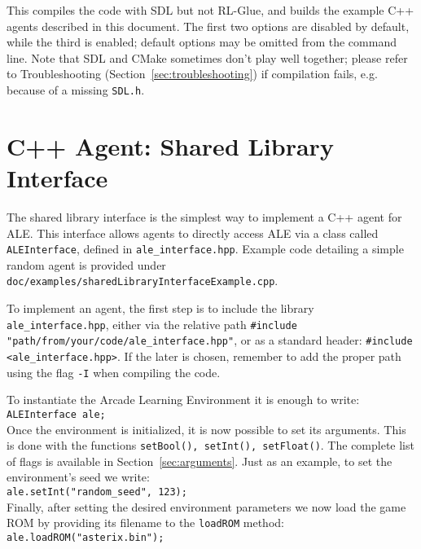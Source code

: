 \documentclass[12pt]{article}
\begin{document}
This compiles the code with SDL but not RL-Glue, and builds the example C++ agents described
in this document. The first two options are disabled by default, while the third is
enabled; default options may be omitted from the command line. Note that SDL and CMake sometimes 
don't play well together; please refer to Troubleshooting 
(Section~\ref{sec:troubleshooting}) if compilation fails, e.g. because of a missing \verb+SDL.h+.

\section{C++ Agent: Shared Library Interface} \label{sec:shared_library_interface}

The shared library interface is the simplest way to implement a C++ agent for ALE.
This interface allows agents to directly access ALE via a class called
\verb+ALEInterface+, defined in \verb+ale_interface.hpp+. Example code detailing a simple random agent is provided under \verb+doc/examples/sharedLibraryInterfaceExample.cpp+.

To implement an agent, the first step is to include the library \verb+ale_interface.hpp+, either via 
the relative path \verb+#include "path/from/your/code/ale_interface.hpp"+, or as a standard 
header: \verb+#include <ale_interface.hpp>+. If the later is chosen, remember to add the proper 
path using the flag \verb+-I+ when compiling the code.

To instantiate the Arcade Learning Environment it is enough to write:\\

\verb+ALEInterface ale;+\\

Once the environment is initialized, it is now possible to set its arguments. This is done with the 
functions \verb+setBool(), setInt(), setFloat()+. The complete list of flags is available in 
Section~\ref{sec:arguments}. Just as an example, to set the environment's seed we write:\\

\verb+ale.setInt("random_seed", 123);+\\

Finally, after setting the desired environment parameters we now load the game ROM by providing its filename to the \verb+loadROM+ method:\\

\verb+ale.loadROM("asterix.bin");+\\
\end{document}
